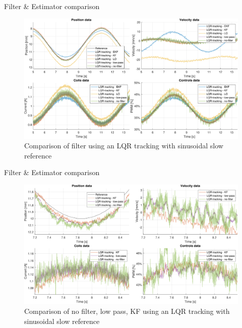 \begin{frame}{Filter \& Estimator comparison}

    \vspace{9pt}

    \begin{figure}[H]
        \centering
        \includegraphics[width=1\linewidth]{./img/MATLAB/results/sinusoidal_slow_linear_star_star.pdf}
        \caption{Comparison of filter using an LQR tracking with sinusoidal slow reference}
    \end{figure}

\end{frame}



\begin{frame}{Filter \& Estimator comparison}

    \vspace{9pt}

    \begin{figure}[H]
        \centering
        \includegraphics[width=1\linewidth]{./img/MATLAB/results/sinusoidal_slow_linear_zoomed_star_no_filter_low_pass_KF.pdf}
        \caption{Comparison of no filter, low pass, KF using an LQR tracking with sinusoidal slow reference}
    \end{figure}

\end{frame}



